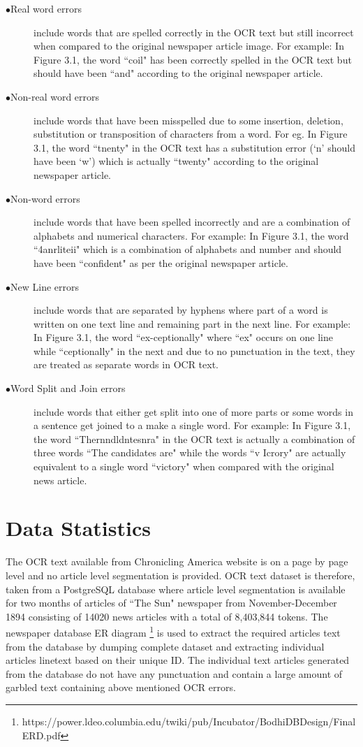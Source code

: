 \documentclass[letterpaper,11pt]{report}
\begin{document}
\begin{description}
 \item[$\bullet$Real word errors] include words that are spelled correctly in the OCR text but still incorrect when compared to the original newspaper article image. For example: In Figure 3.1, the word ``coil"  has been correctly spelled in the OCR text  but should have been ``and" according to the original newspaper article. 
 \item[$\bullet$Non-real word errors] include words that have been misspelled due to some insertion, deletion, substitution or transposition of characters from a word. For eg. In Figure 3.1, the word ``tnenty" in the OCR text has a substitution error (`n' should have been `w') which is actually ``twenty" according to the original newspaper article.
 \item[$\bullet$Non-word errors] include words that have been spelled incorrectly and are a combination of alphabets and numerical characters. For example: In Figure 3.1, the word ``4anrliteii" which is a combination of alphabets and number and should have been ``confident" as per the original newspaper article.
\item[$\bullet$New Line errors] include words that are separated by hyphens where part of a word is written on one text line and remaining part in the next line. For example: In Figure 3.1, the word ``ex-ceptionally" where ``ex" occurs on one line while ``ceptionally" in the next and due to no punctuation in the text, they are treated as separate words in OCR text.
\item[$\bullet$Word Split and Join errors] include words that either get split into one of more parts or some words in a sentence get joined to a make a single word. For example: In Figure 3.1, the word ``Thernndldntesnra" in the OCR text is actually a combination of three words ``The candidates are" while the words ``v Icrory" are actually equivalent to a single word ``victory" when compared with the original news article.
\end{description} 

\section{Data Statistics}
The OCR text available from Chronicling America website is on a page by page level and no article level segmentation is provided. OCR text dataset is therefore, taken from a PostgreSQL database where article level segmentation is available for two months of articles of ``The Sun" newspaper from November-December 1894 consisting of 14020 news articles with a total of 8,403,844 tokens. The newspaper database ER diagram \footnote{https://power.ldeo.columbia.edu/twiki/pub/Incubator/BodhiDBDesign/Final ERD.pdf }
is used to extract the required articles text from the database by dumping complete dataset and extracting individual articles linetext based on their unique ID. The individual text articles generated from the database do not have any punctuation and contain a large amount of garbled text containing above mentioned OCR errors.
\end{document}

